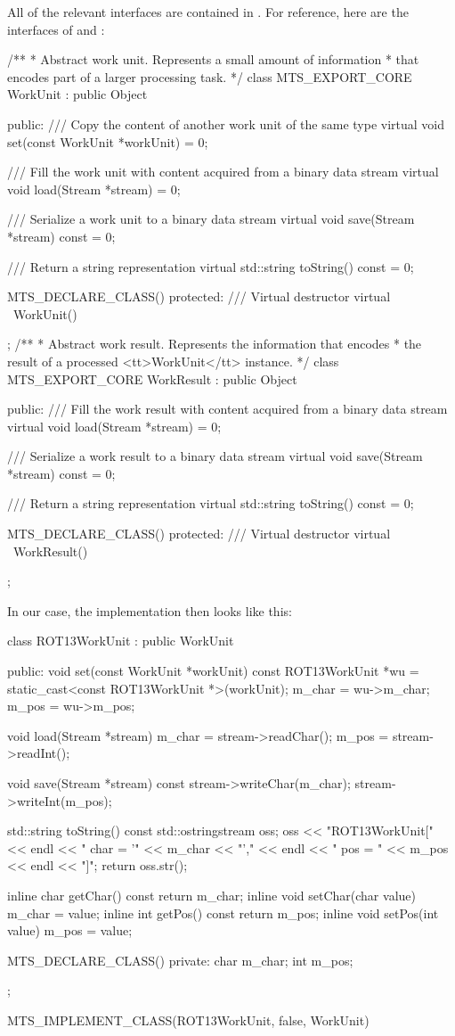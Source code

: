All of the relevant interfaces are contained in .
For reference, here are the interfaces of  and :
\begin{cpp}
/**
 * Abstract work unit. Represents a small amount of information
 * that encodes part of a larger processing task.
 */
class MTS_EXPORT_CORE WorkUnit : public Object {
public:
    /// Copy the content of another work unit of the same type
    virtual void set(const WorkUnit *workUnit) = 0;

    /// Fill the work unit with content acquired from a binary data stream
    virtual void load(Stream *stream) = 0;

    /// Serialize a work unit to a binary data stream
    virtual void save(Stream *stream) const = 0;

    /// Return a string representation
    virtual std::string toString() const = 0;

    MTS_DECLARE_CLASS()
protected:
    /// Virtual destructor
    virtual ~WorkUnit() { }
};
/**
 * Abstract work result. Represents the information that encodes
 * the result of a processed <tt>WorkUnit</tt> instance.
 */
class MTS_EXPORT_CORE WorkResult : public Object {
public:
    /// Fill the work result with content acquired from a binary data stream
    virtual void load(Stream *stream) = 0;

    /// Serialize a work result to a binary data stream
    virtual void save(Stream *stream) const = 0;

    /// Return a string representation
    virtual std::string toString() const = 0;

    MTS_DECLARE_CLASS()
protected:
    /// Virtual destructor
    virtual ~WorkResult() { }
};
\end{cpp}
In our case, the  implementation then looks like this:
\begin{cpp}
class ROT13WorkUnit : public WorkUnit {
public:
    void set(const WorkUnit *workUnit) {
        const ROT13WorkUnit *wu =
            static_cast<const ROT13WorkUnit *>(workUnit);
        m_char = wu->m_char;
        m_pos = wu->m_pos;
    }

    void load(Stream *stream) {
        m_char = stream->readChar();
        m_pos = stream->readInt();
    }

    void save(Stream *stream) const {
        stream->writeChar(m_char);
        stream->writeInt(m_pos);
    }

    std::string toString() const {
        std::ostringstream oss;
        oss << "ROT13WorkUnit[" << endl
            << "  char = '" << m_char << "'," << endl
            << "  pos = " << m_pos << endl
            << "]";
        return oss.str();
    }

    inline char getChar() const { return m_char; }
    inline void setChar(char value) { m_char = value; }
    inline int getPos() const { return m_pos; }
    inline void setPos(int value) { m_pos = value; }

    MTS_DECLARE_CLASS()
private:
    char m_char;
    int m_pos;
};

MTS_IMPLEMENT_CLASS(ROT13WorkUnit, false, WorkUnit)
\end{cpp}
